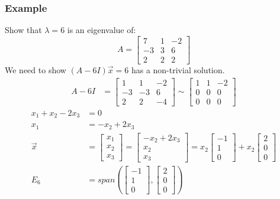 \documentclass[letterpaper, 12pt]{math}
\begin{document}
\subsubsection*{Example}
Show that \( \lambda = 6 \) is an eigenvalue of:
\[ A = \begin{bmatrix}7 & 1 & -2 \\ -3 & 3 & 6 \\ 2 & 2 & 2\end{bmatrix} \]
We need to show \( (A-6I)\vec{x} = 6 \) has a non-trivial solution.
\begin{align*}
  A-6I &= \begin{bmatrix}
    1 & 1 & -2 \\
    -3 & -3 & 6 \\
    2 & 2 & -4
  \end{bmatrix} \sim \begin{bmatrix}
    1 & 1 & -2 \\
    0 & 0 & 0 \\
    0 & 0 & 0
  \end{bmatrix}
\end{align*}
\begin{align*}
  x_1+x_2-2x_3 &= 0 \\
  x_1 &= -x_2+2x_3 \\
  \vec{x} &= \begin{bmatrix}x_1 \\ x_2 \\ x_3\end{bmatrix}
    = \begin{bmatrix}-x_2+2x_3 \\ x_2 \\ x_3\end{bmatrix}
    = x_2\begin{bmatrix}-1 \\ 1 \\ 0\end{bmatrix}+
    x_2\begin{bmatrix}2 \\ 0 \\ 0\end{bmatrix} \\
  E_6 &= span\left(\begin{bmatrix}-1 \\ 1 \\ 0\end{bmatrix},
    \begin{bmatrix}2 \\ 0 \\ 0\end{bmatrix}\right)
\end{align*}
\end{document}
